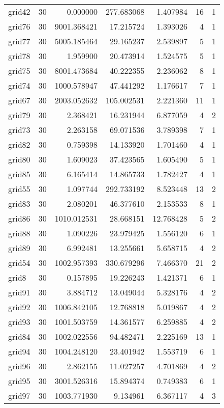 \documentclass[../../../thesis.tex]{subfiles}
\begin{document}
\begin{longtable}{|l|r|r|r|r|r|r|}
grid42 & 30 & 0.000000 & 277.683068 & 1.407984 & 16 & 1 \\
grid76 & 30 & 9001.368421 & 17.215724 & 1.393026 & 4 & 1 \\
grid77 & 30 & 5005.185464 & 29.165237 & 2.539897 & 5 & 1 \\
grid78 & 30 & 1.959900 & 20.473914 & 1.524575 & 5 & 1 \\
grid75 & 30 & 8001.473684 & 40.222355 & 2.236062 & 8 & 1 \\
grid74 & 30 & 1000.578947 & 47.441292 & 1.176617 & 7 & 1 \\
grid67 & 30 & 2003.052632 & 105.002531 & 2.221360 & 11 & 1 \\
grid79 & 30 & 2.368421 & 16.231944 & 6.877059 & 4 & 2 \\
grid73 & 30 & 2.263158 & 69.071536 & 3.789398 & 7 & 1 \\
grid82 & 30 & 0.759398 & 14.133920 & 1.701460 & 4 & 1 \\
grid80 & 30 & 1.609023 & 37.423565 & 1.605490 & 5 & 1 \\
grid85 & 30 & 6.165414 & 14.865733 & 1.782427 & 4 & 1 \\
grid55 & 30 & 1.097744 & 292.733192 & 8.523448 & 13 & 2 \\
grid83 & 30 & 2.080201 & 46.377610 & 2.153533 & 8 & 1 \\
grid86 & 30 & 1010.012531 & 28.668151 & 12.768428 & 5 & 2 \\
grid88 & 30 & 1.090226 & 23.979425 & 1.556120 & 6 & 1 \\
grid89 & 30 & 6.992481 & 13.255661 & 5.658715 & 4 & 2 \\
grid54 & 30 & 1002.957393 & 330.679296 & 7.466370 & 21 & 2 \\
grid8 & 30 & 0.157895 & 19.226243 & 1.421371 & 6 & 1 \\
grid91 & 30 & 3.884712 & 13.049044 & 5.328176 & 4 & 2 \\
grid92 & 30 & 1006.842105 & 12.768818 & 5.019867 & 4 & 2 \\
grid93 & 30 & 1001.503759 & 14.361577 & 6.259885 & 4 & 2 \\
grid84 & 30 & 1002.022556 & 94.482471 & 2.225169 & 13 & 1 \\
grid94 & 30 & 1004.248120 & 23.401942 & 1.553719 & 6 & 1 \\
grid96 & 30 & 2.862155 & 11.027257 & 4.701869 & 4 & 2 \\
grid95 & 30 & 3001.526316 & 15.894374 & 0.749383 & 6 & 1 \\
grid97 & 30 & 1003.771930 & 9.134961 & 6.367117 & 4 & 3 \\

\end{longtable}
\end{document}
